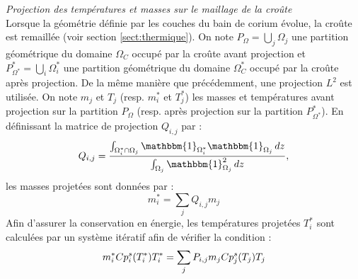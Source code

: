 {\it Projection des températures et masses sur le maillage de la croûte}\\
Lorsque la géométrie définie par les couches du bain de corium évolue, la croûte est remaillée (voir section \ref{sect:thermique}). On note $P_{\Omega}=\displaystyle{\bigcup_j} \Omega_j$ une partition géométrique du domaine $\Omega_C$ occupé par la croûte avant projection et $P_{\Omega^*}^*=\displaystyle{\bigcup_i} \Omega_i^*$ une partition géométrique du domaine $\Omega_C^*$ occupé par la croûte après projection. De la même manière que précédemment, une projection $L^2$ est utilisée.
On note $m_j$ et $T_j$ (resp. $m_i^*$ et $T_j^*$) les masses et températures avant projection sur la partition $P_{\Omega}$ (resp. après projection sur la partition $P_{\Omega^*}^*$). En définissant la matrice de projection $Q_{i,j}$ par :
$$Q_{i,j}=\frac{\int_{\Omega_i^*\cap\Omega_j}{\mathbbm{1}}_{\Omega_i^*}{\mathbbm{1}}_{\Omega_j}\, dz}{ \int_{\Omega_j}{\mathbbm{1}}_{\Omega_j}^2\, dz},$$ les masses projetées sont données par :
$$m_i^*=\sum_j Q_{i,j} m_j$$
Afin d'assurer la conservation en énergie, les températures projetées $T_i^*$ sont calculées par un système itératif afin de vérifier la condition :
$$m_i^* \heatCp[s]{i}(T_i^*) T_i^* = \sum_j P_{i,j} m_j \heatCp[s]{j} (T_j) T_j$$